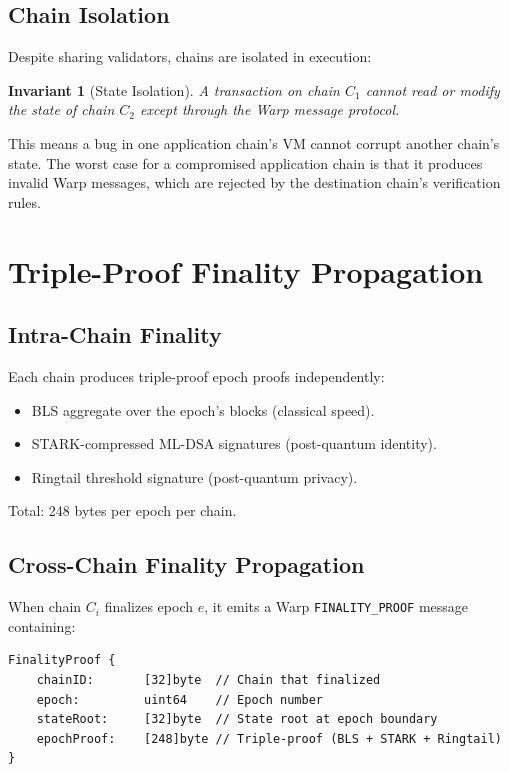 \documentclass[11pt,a4paper]{article}
\newtheorem{invariant}{Invariant}[section]
\begin{document}
\subsection{Chain Isolation}

Despite sharing validators, chains are isolated in execution:

\begin{invariant}[State Isolation]
A transaction on chain $C_1$ cannot read or modify the state of chain $C_2$ except through the Warp message protocol.
\end{invariant}

This means a bug in one application chain's VM cannot corrupt another chain's state. The worst case for a compromised application chain is that it produces invalid Warp messages, which are rejected by the destination chain's verification rules.

\section{Triple-Proof Finality Propagation}

\subsection{Intra-Chain Finality}

Each chain produces triple-proof epoch proofs independently:
\begin{itemize}[leftmargin=2em]
\item BLS aggregate over the epoch's blocks (classical speed).
\item STARK-compressed ML-DSA signatures (post-quantum identity).
\item Ringtail threshold signature (post-quantum privacy).
\end{itemize}

Total: 248 bytes per epoch per chain.

\subsection{Cross-Chain Finality Propagation}

When chain $C_i$ finalizes epoch $e$, it emits a Warp \texttt{FINALITY\_PROOF} message containing:

\begin{verbatim}
FinalityProof {
    chainID:       [32]byte  // Chain that finalized
    epoch:         uint64    // Epoch number
    stateRoot:     [32]byte  // State root at epoch boundary
    epochProof:    [248]byte // Triple-proof (BLS + STARK + Ringtail)
}
\end{verbatim}
\end{document}
